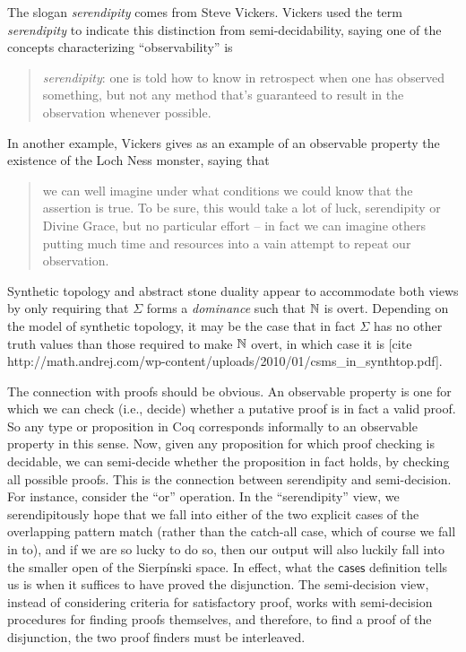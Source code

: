 The slogan \emph{serendipity} comes from Steve Vickers. Vickers used the term \emph{serendipity} to indicate this distinction from semi-decidability, saying one of the concepts characterizing ``observability'' is \cite{vickersGeoThDB}
\begin{quote}
\emph{serendipity}: one is told how to know in retrospect when one has observed something, but not any method that's guaranteed to result in the observation whenever possible.
\end{quote}

In another example, Vickers gives as an example of an observable property the existence of the Loch Ness monster, saying that
\begin{quote}
we can well imagine under what conditions we could know that the assertion is true. To be sure, this would take a lot of luck, serendipity or Divine Grace, but no particular effort -- in fact we can imagine others putting much time and resources into a vain attempt to repeat our observation.
\end{quote}

Synthetic topology and abstract stone duality appear to accommodate both views by only requiring that $\Sigma$ forms a \emph{dominance} such that $\mathbb{N}$ is overt. Depending on the model of synthetic topology, it may be the case that in fact $\Sigma$ has no other truth values than those required to make $\mathbb{N}$ overt, in which case it is [cite http://math.andrej.com/wp-content/uploads/2010/01/csms_in_synthtop.pdf].

The connection with proofs should be obvious. An observable property is one for which we can check (i.e., decide) whether a putative proof is in fact a valid proof. So any type or proposition in Coq corresponds informally to an observable property in this sense. Now, given any proposition for which proof checking is decidable, we can semi-decide whether the proposition in fact holds, by checking all possible proofs. This is the connection between serendipity and semi-decision. For instance, consider the ``or'' operation. In the ``serendipity'' view, we serendipitously hope that we fall into either of the two explicit cases of the overlapping pattern match (rather than the catch-all case, which of course we fall in to), and if we are so lucky to do so, then our output will also luckily fall into the smaller open of the Sierp\'inski space. In effect, what the $\mathsf{cases}$ definition tells us is when it suffices to have proved the disjunction. The semi-decision view, instead of considering criteria for satisfactory proof, works with semi-decision procedures for finding proofs themselves, and therefore, to find a proof of the disjunction, the two proof finders must be interleaved.

